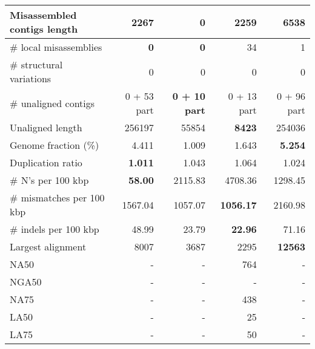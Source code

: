\documentclass[12pt,a4paper]{article}
\begin{document}
\begin{table}[ht]
\begin{center}
\begin{tabular}{|l*{4}{|r}|}
Misassembled contigs length & 2267 & {\bf 0} & 2259 & 6538 \\ \hline
\# local misassemblies & {\bf 0} & {\bf 0} & 34 & 1 \\ \hline
\# structural variations & 0 & 0 & 0 & 0 \\ \hline
\# unaligned contigs & 0 + 53 part & {\bf 0 + 10 part} & 0 + 13 part & 0 + 96 part \\ \hline
Unaligned length & 256197 & 55854 & {\bf 8423} & 254036 \\ \hline
Genome fraction (\%) & 4.411 & 1.009 & 1.643 & {\bf 5.254} \\ \hline
Duplication ratio & {\bf 1.011} & 1.043 & 1.064 & 1.024 \\ \hline
\# N's per 100 kbp & {\bf 58.00} & 2115.83 & 4708.36 & 1298.45 \\ \hline
\# mismatches per 100 kbp & 1567.04 & 1057.07 & {\bf 1056.17} & 2160.98 \\ \hline
\# indels per 100 kbp & 48.99 & 23.79 & {\bf 22.96} & 71.16 \\ \hline
Largest alignment & 8007 & 3687 & 2295 & {\bf 12563} \\ \hline
NA50 & - & - & 764 & - \\ \hline
NGA50 & - & - & - & - \\ \hline
NA75 & - & - & 438 & - \\ \hline
LA50 & - & - & 25 & - \\ \hline
LA75 & - & - & 50 & - \\ \hline
\end{tabular}
\end{center}
\end{table}
\end{document}
